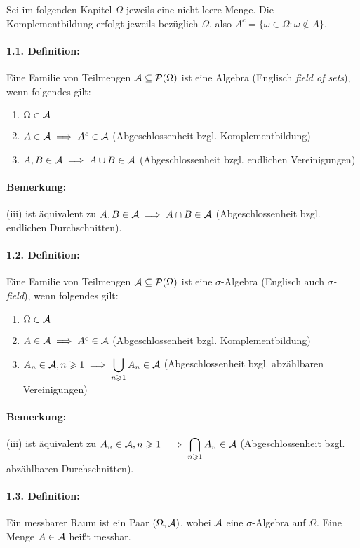 \documentclass[12pt]{report}
\begin{document}
Sei im folgenden Kapitel $\Omega$ jeweils eine nicht-leere Menge. Die Komplementbildung erfolgt jeweils bez\"uglich $\Omega$, also $A^c=\{\omega\in\Omega:\omega\notin A\}$.

\paragraph{1.1. Definition:} Eine Familie von Teilmengen $\mathcal{A}\subseteq\mathcal{P}(\Omega)$ ist eine Algebra (Englisch \textit{field of sets}), wenn folgendes gilt:
\begin{enumerate}[label=(\roman*)]
    \item $\Omega\in\mathcal{A}$ 
    \item $A\in\mathcal{A}\implies A^c\in\mathcal{A}$ (Abgeschlossenheit bzgl. Komplementbildung)
    \item $A,B\in\mathcal{A}\implies A\cup B\in\mathcal{A}$ (Abgeschlossenheit bzgl. endlichen Vereinigungen)
\end{enumerate}

\paragraph{Bemerkung:} (iii) ist \"aquivalent zu $A,B\in\mathcal{A}\implies A\cap B\in\mathcal{A}$ (Abgeschlossenheit bzgl. endlichen Durchschnitten).

\paragraph{1.2. Definition:} Eine Familie von Teilmengen $\mathcal{A}\subseteq\mathcal{P}(\Omega)$ ist eine $\sigma$-Algebra (Englisch auch \textit{$\sigma$-field}), wenn folgendes gilt:
\begin{enumerate}[label=(\roman*)]
    \item $\Omega\in\mathcal{A}$
    \item $A\in\mathcal{A}\implies A^c\in\mathcal{A}$ (Abgeschlossenheit bzgl. Komplementbildung)
    \item $A_n\in\mathcal{A},n\geqslant1\implies\displaystyle\bigcup_{n\geqslant1}A_n\in\mathcal{A}$ (Abgeschlossenheit bzgl. abz\"ahlbaren Vereinigungen)
\end{enumerate}

\paragraph{Bemerkung:} (iii) ist \"aquivalent zu $A_n\in\mathcal{A},n\geqslant1\implies\displaystyle\bigcap_{n\geqslant1}A_n\in\mathcal{A}$ (Abgeschlossenheit bzgl. abz\"ahlbaren Durchschnitten).

\paragraph{1.3. Definition:} Ein messbarer Raum ist ein Paar $(\Omega,\mathcal{A})$, wobei $\mathcal{A}$ eine $\sigma$-Algebra auf $\Omega$. Eine Menge $A\in\mathcal{A}$ hei\ss{}t messbar. 
\end{document}
